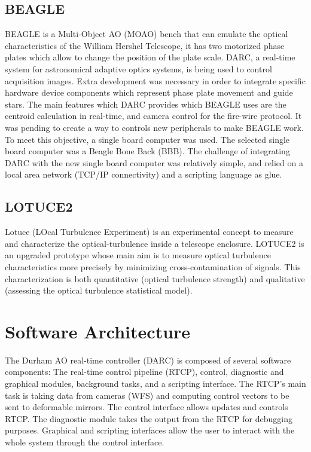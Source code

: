 \documentclass[]{spie}  %
\begin{document}
\subsection{BEAGLE}
BEAGLE is a Multi-Object AO (MOAO) bench that can emulate the optical
characteristics of the William Hershel Telescope, it has two motorized phase
plates which allow to change the position of the plate scale. DARC, a real-time
system for astronomical adaptive optics systems, is being used to control
acquisition images. Extra development was necessary in order to integrate specific hardware
device components which represent phase plate movement and guide stars. The
main features which DARC provides which BEAGLE uses are the centroid calculation
in real-time\cite{basden2012wavefront}, and camera control for the fire-wire
protocol. It was pending to create a way to controls new peripherals
to make BEAGLE work. To meet this objective, a single board computer was used.
The selected single board computer was a Beagle Bone Back (BBB). The challenge
of integrating DARC with the new single board computer was relatively simple, and
relied on a local area network (TCP/IP connectivity) and a scripting language
as glue. 


\subsection{LOTUCE2}
Lotuce (LOcal Turbulence Experiment)\cite{ziad1a2013lotuce} is an experimental
concept to measure and characterize the optical-turbulence inside a telescope
enclosure\cite{berdja1afirst}. LOTUCE2 is an upgraded
prototype whose main aim is to measure optical turbulence characteristics more
precisely by minimizing cross-contamination of signals. This characterization
is both quantitative (optical turbulence strength) and qualitative (assessing
        the optical turbulence statistical model). 


\section{Software Architecture}\label{sec:SWA} 
The Durham AO real-time controller (DARC) is composed of several software
components: The real-time control pipeline (RTCP), control, diagnostic and
graphical modules, background tasks, and a scripting interface. The RTCP's main
task is taking data from cameras (WFS) and computing control vectors to be sent
to deformable mirrors. The control interface allows updates and controls RTCP.
The diagnostic module takes the output from the RTCP for debugging purposes.
Graphical and scripting interfaces allow the user to interact with the whole
system through the control interface\cite{basden2010durham}.
\end{document}
